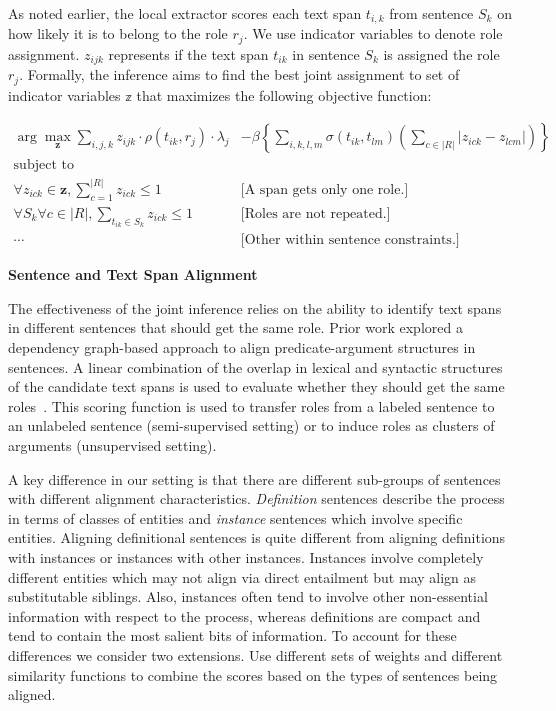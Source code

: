 As noted earlier, the local extractor scores each text span $t_{i,k}$ from sentence $S_k$ on how likely it is to belong to the role $r_j$. We use indicator variables to denote role assignment. $z_{ijk}$ represents if the text span $t_{ik}$ in sentence $S_k$ is assigned the role $r_j$. Formally, the inference aims to find the best joint assignment to set of indicator variables $\mathbb{z}$ that maximizes the following objective function:

\begin{align*}
 \arg\max_{\mathbf{z}}  \sum_{i,j,k} z_{ijk} \cdot \rho(t_{ik}, r_j) \cdot \lambda_{j}
	&- \beta \left\{ \sum_{i,k,l,m} \sigma(t_{ik}, t_{lm}) \left(\sum_{c \in |R|} |z_{ick} - z_{lcm}| \right) \right\}\\
\mbox{subject to} \\
\forall z_{ick} \in \mathbf{z}, \sum_{c = 1}^{|R|} z_{ick} \le 1  &\mbox{[A span gets only one role.]}\\
\forall S_k \forall c \in |R|, \sum_{t_{ik} \in S_k} z_{ick} \le 1  & \mbox{[Roles are not repeated.]} \\
 \cdots&  \mbox{[Other within sentence constraints.]}
\end{align*}

{\bf Sentence and Text Span Alignment}

The effectiveness of the joint inference relies on the ability to identify text spans in different sentences that should get the same role. 
Prior work explored a dependency graph-based approach to align predicate-argument structures in sentences. A linear combination of the overlap in lexical and syntactic structures of the candidate text spans is used to evaluate whether they should get the same roles~\cite{furstenau-emnlp2009,furstenau2012semi,lang-naacl2010}.
This scoring function is used to transfer roles from a labeled sentence to an unlabeled sentence (semi-supervised setting) or to induce roles as clusters of arguments (unsupervised setting). 

A key difference in our setting is that there are different sub-groups of sentences with different alignment characteristics. 
{\em Definition} sentences describe the process in terms of classes of entities and {\em instance} sentences which involve specific entities.
Aligning definitional sentences is quite different from aligning definitions with instances or instances with other instances. 
Instances involve completely different entities which may not align via direct entailment but may align as substitutable siblings.
Also, instances often tend to involve other non-essential information with respect to the process, 
whereas definitions are compact and tend to contain the most salient bits of information. 
To account for these differences we consider two extensions. Use different sets of weights and different similarity functions to combine the scores based on the types of sentences being aligned.

